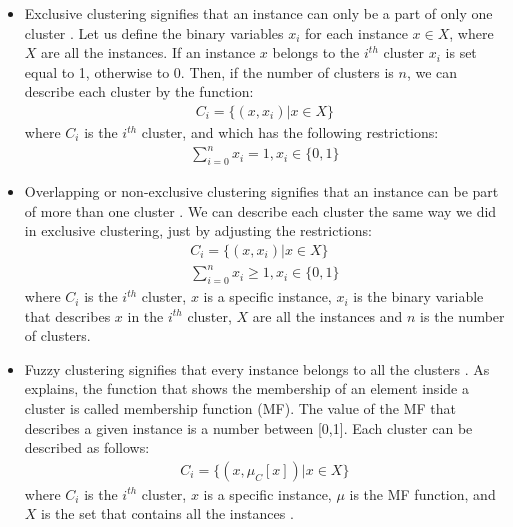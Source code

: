 \begin{itemize}
\item Exclusive clustering signifies that an instance can only be a part of only one cluster \autocite[492]{tanSteinKum}. Let us define the binary variables \(x_{i}\) for each instance \(x \in X \), where \(X\) are all the instances. If an instance \(x\) belongs to the \(i^{th}\) cluster \(x_{i}\) is set equal to 1, otherwise to 0. Then, if the number of clusters is \(n\), we can describe each cluster by the function:
\begin{eqnarray*}
C_{i} = \{(x, x_{i})|x \in X\}
\end{eqnarray*}
where \(C_{i}\) is the \(i^{th}\) cluster, and which has the following restrictions:
\begin{eqnarray*}
\sum_{i=0}^{n} x_{i} = 1, x_{i} \in \{0,1\}
\end{eqnarray*}
\item Overlapping or non-exclusive clustering signifies that an instance can be part of more than one cluster \autocite[492]{tanSteinKum}. We can describe each cluster the same way we did in exclusive clustering, just by adjusting the restrictions:
\begin{eqnarray*}
C_{i} = \{(x, x_{i})|x \in X\} \\
\sum_{i=0}^{n} x_{i} \geq 1, x_{i} \in \{0,1\}
\end{eqnarray*}
where \(C_{i}\) is the \(i^{th}\) cluster, \(x\) is a specific instance, \(x_{i}\) is the binary variable that describes \(x\) in the \(i^{th}\) cluster, \(X\) are all the instances and \(n\) is the number of clusters.
\item Fuzzy clustering signifies that every instance belongs to all the clusters \autocite[492]{tanSteinKum}. As \textcite{kantar} explains, the function that shows the membership of an element inside a cluster is called membership function (MF). The value of the MF that describes a given instance is a number between [0,1]. Each cluster can be described as follows:
\begin{eqnarray*}
C_{i} = \{(x, \mu_{C}[x])|x \in X\}
\end{eqnarray*}
where \(C_{i}\) is the \(i^{th}\) cluster, \(x\) is a specific instance, \(\mu\) is the MF function, and \( X\) is the set that contains all the instances \autocite[416]{kantar}.
\end{itemize}

